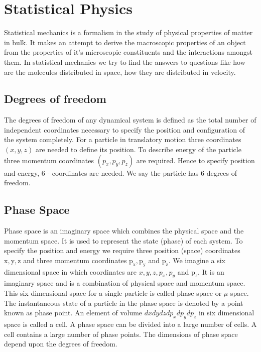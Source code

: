\chapter{Statistical Physics}
Statistical mechanics is a formalism in the study of physical properties of matter in bulk. It makes an attempt to derive the macroscopic properties of an object from the properties of it's microscopic constituents and the interactions amongst them. In statistical mechanics we try to find the answers to questions like how are the molecules distributed in space, how they are distributed in velocity.
\section{Degrees of freedom}
The degrees of freedom of any dynamical system is defined as the total number of independent coordinates necessary to specify the position and configuration of the system completely.
For a particle in translatory motion three coordinates $(x, y, z)$ are needed to define its position. To describe energy of the particle three momentum coordinates $\left(p_{x}, p_{y}, p_{z}\right)$ are required. Hence to specify position and energy, 6 - coordinates are needed. We say the particle has 6 degrees of freedom.
\section{Phase Space}
Phase space is an imaginary space which combines the physical space and the momentum space. It is used to represent the state (phase) of each system.
To specify the position and energy we require three position (space) coordinates $\mathrm{x}, \mathrm{y}, \mathrm{z}$ and three momentum coordinates $\mathrm{p}_{\mathrm{x}}, \mathrm{p}_{\mathrm{y}}$ and $\mathrm{p}_{\mathrm{z}}$. We imagine a six dimensional space in which coordinates are $x, y, z, p_{x}, p_{y}$ and $\mathrm{p}_{z}$. It is an imaginary space and is a combination of physical space and momentum space. This six dimensional space for a single particle is called phase space or $\mu$-space. The instantaneous state of a particle in the phase space is denoted by a point known as phase point. An element of volume $d x d y d z d p_{x} d p_{y} d p_{z}$ in six dimensional space is called a cell. A phase space can be divided into a large number of cells. A cell contains a large number of phase points. The dimensions of phase space depend upon the degrees of freedom.
